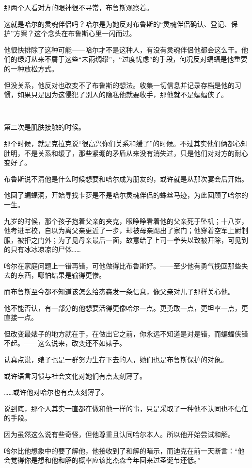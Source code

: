 \documentclass[../main.tex]{subfiles}
\begin{document}
那两个人看对方的眼神很不寻常，布鲁斯观察着。

这就是哈尔的灵魂伴侣吗？哈尔是为她反对布鲁斯的“灵魂伴侣确认、登记、保护”方案？这个念头在布鲁斯心里一闪而过。

他很快排除了这种可能——哈尔才不是这种人，有没有灵魂伴侣他都会这么干。他们的绿灯从来不屑于这些“未雨绸缪”，“过度忧虑”的手段，何况反对蝙蝠是他重要的一种放松方式。

但没关系，他反对也改变不了布鲁斯的想法。收集一切信息并记录存档是他的习惯，如果只是因为这侵犯了别人的隐私他就要收手，那他就不是蝙蝠侠了。

~\

第二次是肌肤接触的时候。

那个时候，就是克拉克说“很高兴你们关系和缓了”的时候。不过其实他们俩都心知肚明，不是关系和缓了，那些紧绷的矛盾从来没有消失过，只是他们对对方的耐心变好了。

布鲁斯说不清他是什么时候想要和哈尔成为朋友的，或许就是从那次宴会后开始。

他回了蝙蝠洞，开始寻找卡萝是不是哈尔灵魂伴侣的蛛丝马迹，为此回顾了哈尔的一生。

九岁的时候，那个孩子抱着父亲的夹克，眼睁睁看着他的父亲死于坠机；十八岁，他考进军校，自以为离父亲更近了一步，却被母亲踢出了家门；他穿着空军上尉制服，被拒之门外；为了见母亲最后一面，故意给了上司一拳头以致被开除，可见到的只有冰冰凉凉的尸体……

哈尔在家庭问题上一错再错，可他做得比布鲁斯好。——至少他有勇气挽回那些失去的东西，哪怕结果是输得更惨。

而布鲁斯至今都不知道该怎么给杰森发一条信息，像父亲对儿子那样关心他。

他不能否认，有一部分的他想要活得更像哈尔一点。更勇敢一点，更坦率一点，更直接一点。

但改变最婊子的地方就在于，在做出它之前，你永远不知道是对是错，而蝙蝠侠错不起。——这么说来，改变还不如婊子。

认真点说，婊子也是一群努力生存下去的人，她们也是布鲁斯保护的对象。

或许语言习惯与社会文化对她们有点太刻薄了。

……或许他对哈尔也有点太刻薄了。

说到底，那个人其实一直都在做和他一样的事，只是采取了一种他不认同也不信任的手段。

因为虽然这么说有些奇怪，但他尊重且认同哈尔本人。所以他开始尝试和解。

哈尔比他想象中的要了解他，他接收到了和解的暗示，而迪克在前一天断言：“他会觉得你是想和他和解的概率应该比杰森今年回来过圣诞节还低。”
\end{document}
